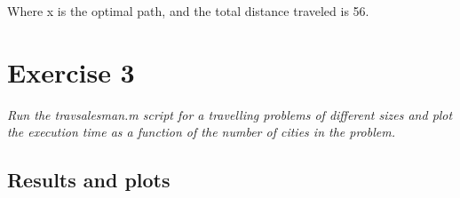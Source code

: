 \documentclass{article}
\begin{document}
  \noindent
  Where x is the optimal path, and the total distance traveled is 56.

  \newpage

\section*{Exercise 3}

  \textit{Run the travsalesman.m script for a travelling problems of different
  sizes and plot the execution time as a function of the number of cities in
  the problem.}

  \subsection*{Results and plots}
\end{document}
